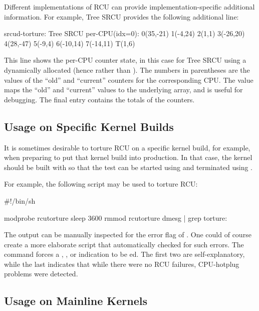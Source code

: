 Different implementations of RCU can provide implementation-specific
additional information.
For example, Tree SRCU provides the following
additional line:

\begin{VerbatimU}[breaklines=true]
	srcud-torture: Tree SRCU per-CPU(idx=0): 0(35,-21) 1(-4,24) 2(1,1) 3(-26,20) 4(28,-47) 5(-9,4) 6(-10,14) 7(-14,11) T(1,6)
\end{VerbatimU}

This line shows the per-CPU counter state, in this case for Tree SRCU
using a dynamically allocated  (hence  rather than
).
The numbers in parentheses are the values of the ``old'' and
``current'' counters for the corresponding CPU\@.
The  value maps the
``old'' and ``current'' values to the underlying array, and is useful for
debugging.
The final  entry contains the totals of the counters.

\subsection{Usage on Specific Kernel Builds}

It is sometimes desirable to torture RCU on a specific kernel build,
for example, when preparing to put that kernel build into production.
In that case, the kernel should be built with 
so that the test can be started using  and terminated using .

For example, the following script may be used to torture RCU\@:

\begin{VerbatimU}
	#!/bin/sh

	modprobe rcutorture
	sleep 3600
	rmmod rcutorture
	dmesg | grep torture:
\end{VerbatimU}

The output can be manually inspected for the error flag of \qco{!!!}.
One could of course create a more elaborate script that automatically
checked for such errors.
The  command forces a ,
, or  indication to be ed.
The first
two are self-explanatory, while the last indicates that while there
were no RCU failures, CPU-hotplug problems were detected.


\subsection{Usage on Mainline Kernels}


